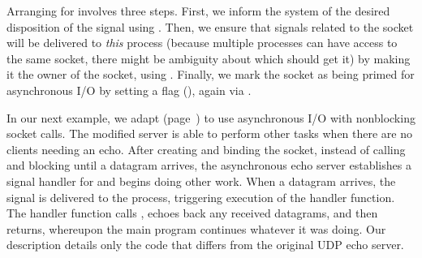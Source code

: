 Arranging for  involves three steps.  First, we
inform the system of the desired disposition of the signal using
.  Then, we ensure that signals related
to the socket will be delivered to \emph{this} process (because multiple
processes can have access to the same socket, there might be ambiguity about 
which should get it) by making it the owner of the socket, using
.  Finally, we mark the  socket as being primed
for asynchronous I/O by setting a flag (),
again via .

In our next example, we adapt 
(page~\pageref{code/UDPEchoServer.c}) to use
asynchronous I/O with nonblocking socket calls.
The modified server is able to perform
other tasks when there are no clients needing
an echo.  After creating and binding the  socket,
instead of calling  and blocking
until a datagram arrives, the asynchronous
echo server establishes a signal handler for 
and begins doing
other work.  When a datagram arrives, the  signal
is delivered to the
process, triggering execution of the handler function.  The
handler function calls ,
echoes back any received datagrams, and then returns, whereupon the
main program continues whatever it was doing.
Our description details only the code that differs
from the original UDP echo server.


